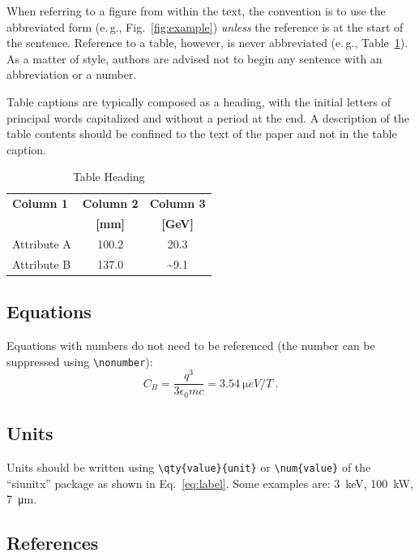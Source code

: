 \documentclass[%
               biblatex,     %
               ]{jacow}
\begin{document}
When referring to a figure from within the text, the
convention is to use the abbreviated form (e.\,g., Fig.~\ref{fig:example})
\emph{unless} the reference is at the start of the sentence. Reference to a
table, however, is never abbreviated (e.\,g., Table~\ref{tab:example}).
As a matter of style, authors are advised not to begin any sentence with an abbreviation or a number.

Table captions are typically composed as a heading, with the initial letters of principal words capitalized and without a period at the end. A description of the table contents should be confined to the text of the paper and not in the table caption. 
\begin{table}[!hbt]
   \centering
   \caption{Table Heading}
   \begin{tabular}{lcc}
       \toprule
       \textbf{Column 1} & \textbf{Column 2} & \textbf{Column 3} \\ 
                         & \textbf{[mm]}     & \textbf{[GeV]}	 \\
       \midrule
          Attribute A    & \num{100.2}       & \num{20.3}        \\
          Attribute B    & \num{137.0}       & \num{~9.1}        \\
       \bottomrule
   \end{tabular}
   \label{tab:example}
\end{table}

\subsection{Equations}

Equations with numbers do not need to be referenced (the number can be suppressed using \verb|\nonumber|):
\begin{equation}\label{eq:label}
    C_B=\frac{q^3}{3\epsilon_{0}mc} = \qty{3.54}{\micro eV/T}\ .
\end{equation}

\subsection{Units}

Units should be written using \verb|\qty{value}{unit}| or \verb|\num{value}| of the “siunitx” package as shown in Eq.~\eqref{eq:label}. Some examples are: \qty{3}{keV}, \qty{100}{kW}, \qty{7}{\um}.

\subsection{References}
\end{document}
